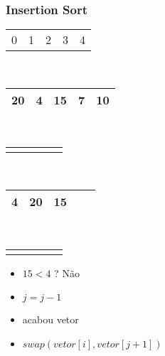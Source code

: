 \documentclass{beamer}
\begin{document}
\begin{frame}
    \frametitle{Insertion Sort}
    \begin{center}
        \begin{table}
            \begin{tabular}{p{0.25cm} p{0.25cm} p{0.25cm} p{0.25cm} p{0.25cm}}
                0 & 1 & 2 & 3 & 4
            \end{tabular} \\
            \begin{tabular}{| p{0.25cm} | p{0.25cm} | p{0.25cm} | p{0.25cm} | p{0.25cm} |}
                \hline
                20 & 4 & 15 & 7 & 10 \\ \hline
            \end{tabular} \\
            \begin{tabular}{p{0.25cm} p{0.25cm} p{0.25cm} p{0.25cm} p{0.25cm}}
                & & \color{blue}{$\updownarrow$} & &
            \end{tabular} \\
            \begin{tabular}{| p{0.25cm} | p{0.25cm} | p{0.25cm} | p{0.25cm} | p{0.25cm} |}
                \hline
                4 & 20 & 15 & & \\ \hline
            \end{tabular} \\
            \begin{tabular}{p{0.25cm} p{0.25cm} p{0.25cm} p{0.25cm} p{0.25cm}}
                 \color{red}{$\uparrow$} & & \color{blue}{$\uparrow$} & &
            \end{tabular}
        \end{table}
	\end{center}
    \begin{itemize}[<+->]
        \item $15 < 4$ ? Não
        \item $j = j - 1$
        \item acabou vetor
        \item $swap(vetor[i], vetor[j + 1])$
    \end{itemize}
\end{frame}
\end{document}
